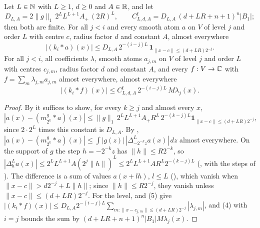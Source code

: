 \begin{lemma}
\label{lem:fine-local-means-atoms}
\leanok
{}
Let $L \in \mathbb{N}$ with $L \geq 1$, $d \geq 0$ and $A \in \mathbb{R}$, and let
\[
  D_{L,A} = 2 \|g\|_1 \, 2^L L^{L+1} A_+ \, (2R)^L , \qquad
  C^{\mathrm f}_{L,d,A} = D_{L,A} \, (d + LR + n + 1)^n |B_1| ;
\]
then both are finite. For all $j < i$ and every smooth atom $a$ on $V$ of level $j$ and order
$L$ with centre $c$, radius factor $d$ and constant $A$, almost everywhere
\[
  |(k_i * a)(x)| \leq D_{L,A} \, 2^{-(i-j)L} \, \mathbf 1_{\|x - c\| \leq (d + LR) 2^{-j}} .
\]
For all $j < i$, all coefficients $\lambda$, smooth atoms $a_{j,m}$ on $V$ of level $j$ and order
$L$ with centres $c_{j,m}$, radius factor $d$ and constant $A$, and every $f : V \to \mathbb{C}$ with
$f = \sum_m \lambda_{j,m} a_{j,m}$ almost everywhere, almost everywhere
\[
  |(k_i * f)(x)| \leq C^{\mathrm f}_{L,d,A} \, 2^{-(i-j)L} \, M \lambda_j(x) .
\]
\end{lemma}

\begin{proof}
\leanok
By  it suffices to show, for every $k \geq j$ and almost every
$x$,
\[
  |a(x) - (m^g_{2^k} * a)(x)| \leq \|g\|_1 \, 2^L L^{L+1} A_+ R^L \, 2^{-(k-j)L}
  \mathbf 1_{\|x - c\| \leq (d + LR) 2^{-j}} ,
\]
since $2 \cdot 2^L$ times this constant is $D_{L,A}$. By ,
$|a(x) - (m^g_{2^k} * a)(x)| \leq \int |g(z)| \, |\Delta^L_{-2^{-k} z} a(x)| \, dz$ almost
everywhere. On the support of $g$ the step $h = -2^{-k} z$ has $\|h\| \leq R 2^{-k}$, so
$|\Delta^L_h a(x)| \leq 2^L L^{L+1} A (2^j \|h\|)^L \leq 2^L L^{L+1} A R^L 2^{-(k-j)L}$
(, with the steps of ). The difference
is a sum of values $a(x + l h)$, $l \leq L$ (), which vanish when
$\|x - c\| > d 2^{-j} + L \|h\|$; since $\|h\| \leq R 2^{-j}$, they vanish unless
$\|x - c\| \leq (d + LR) 2^{-j}$. For the level,  and
 (5) give
$|(k_i * f)(x)| \leq D_{L,A} 2^{-(i-j)L} \sum_{m : \|x - c_{j,m}\| \leq (d + LR) 2^{-j}}
|\lambda_{j,m}|$, and  (4) with $i = j$ bounds the sum by
$(d + LR + n + 1)^n |B_1| M \lambda_j(x)$.
\end{proof}

